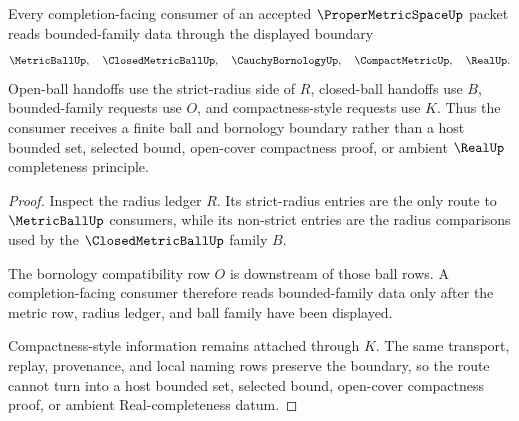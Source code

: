 \begin{theorem}
\label{thm:proper-metric-space-ball-bornology-boundary}
Every completion-facing consumer of an accepted $\ProperMetricSpaceUp$ packet reads bounded-family data through the displayed boundary
$$
\MetricBallUp,\quad \ClosedMetricBallUp,\quad \CauchyBornologyUp,\quad \CompactMetricUp,\quad \RealUp .
$$
Open-ball handoffs use the strict-radius side of $R$, closed-ball handoffs use $B$, bounded-family requests use $O$, and compactness-style requests use $K$. Thus the consumer receives a finite ball and bornology boundary rather than a host bounded set, selected bound, open-cover compactness proof, or ambient $\RealUp$ completeness principle.
\end{theorem}
\begin{proof}
Inspect the radius ledger $R$. Its strict-radius entries are the only route to $\MetricBallUp$ consumers, while its non-strict entries are the radius comparisons used by the $\ClosedMetricBallUp$ family $B$.

The bornology compatibility row $O$ is downstream of those ball rows. A completion-facing consumer therefore reads bounded-family data only after the metric row, radius ledger, and ball family have been displayed.

Compactness-style information remains attached through $K$. The same transport, replay, provenance, and local naming rows preserve the boundary, so the route cannot turn into a host bounded set, selected bound, open-cover compactness proof, or ambient Real-completeness datum.
\end{proof}

